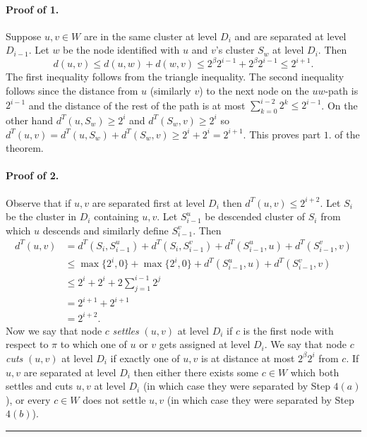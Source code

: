 \documentclass[letterpaper,12pt,oneside,onecolumn]{article}
\newenvironment{proof}{{\bf Proof:  }}{\hfill\rule{2mm}{2mm}}
\begin{document}
\begin{proof}
\paragraph{Proof of 1.}
Suppose $u,v \in W$ are in the same cluster at level $D_i$ and are separated at level $D_{i-1}$. Let $w$ be the node identified with $u$ and $v$'s cluster $S_w$ at level $D_i$. Then
$$d(u,v) \leq d(u,w) + d(w,v) \leq 2^\beta 2^{i-1} + 2^\beta 2^{i-1} \leq 2^{i+1}.$$ The first inequality follows from the triangle inequality. The second inequality follows since the distance from $u$ (similarly $v$) to the next node on the $uw$-path is $2^{i-1}$ and the distance of the rest of the path is at most $\sum_{k=0}^{i-2} 2^k \leq 2^{i-1}$. On the other hand $d^T(u, S_w) \geq 2^i$ and $d^T(S_w, v) \geq 2^i$ so $d^T(u,v) = d^T(u, S_w) + d^T(S_w, v) \geq 2^i + 2^i = 2^{i+1}$. This proves part $1.$ of the theorem.
\paragraph{Proof of 2.}
Observe that if $u,v$ are separated first at level $D_i$ then $d^T(u,v) \leq 2^{i+2}$. Let $S_i$ be the cluster in $D_i$ containing $u,v$. Let $S^u_{i-1}$ be descended cluster of $S_i$ from which $u$ descends and similarly define $S^v_{i-1}$. Then 
\begin{align*}
d^T(u,v) &= d^T(S_i, S^u_{i-1}) + d^T(S_i, S^v_{i-1}) + d^T(S^u_{i-1}, u) + d^T(S^v_{i-1}, v)\\
&\leq \max\{2^i,0\} + \max\{2^i,0\} +  d^T(S^u_{i-1}, u) + d^T(S^v_{i-1}, v) \\
&\leq 2^i + 2^i + 2\sum_{j = 1}^{i-1} 2^j \\
&= 2^{i+1} + 2^{i+1} \\
&= 2^{i+2}.
\end{align*}
Now we say that node $c$ {\it settles} $(u,v)$ at level $D_i$ if $c$ is the first node with respect to $\pi$ to which one of $u$ or $v$ gets assigned at level $D_i$. We say that node $c$ {\it cuts} $(u,v)$ at level $D_i$ if exactly one of $u,v$ is at distance at most $2^\beta 2^i$ from $c$. If $u,v$ are separated at level $D_i$ then either there exists some $c \in W$ which both settles and cuts $u,v$ at level $D_i$ (in which case they were separated by Step $4(a)$), or every $c \in W$ does not settle $u,v$ (in which case they were separated by Step $4(b)$).

\end{proof}
\end{document}
